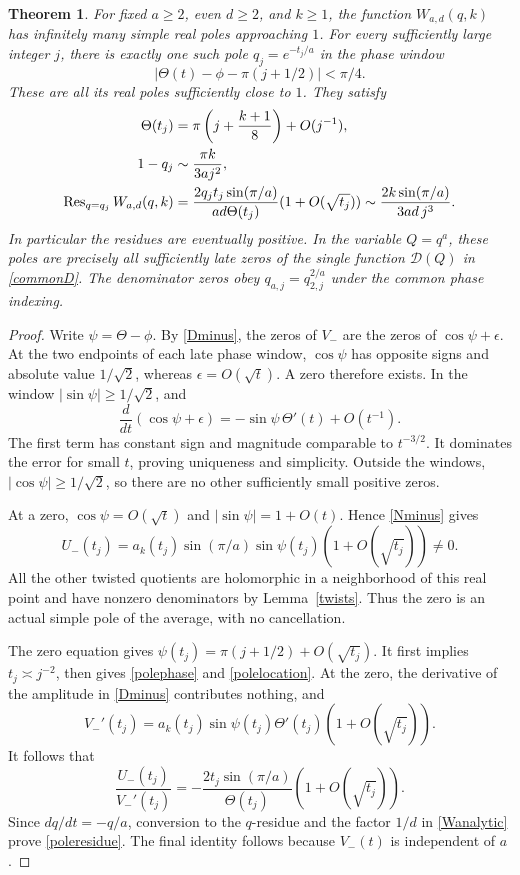 \documentclass[11pt]{amsart}
\newtheorem{theorem}{Theorem}[section]
\theoremstyle{definition}
\theoremstyle{remark}
\numberwithin{equation}{section}
\begin{document}
\begin{theorem}\label{poles}
For fixed $a\ge2$, even $d\ge2$, and $k\ge1$, the function $W_{a,d}(q,k)$ has infinitely many simple real poles approaching $1$. For every sufficiently large integer $j$, there is exactly one such pole $q_j=e^{-t_j/a}$ in the phase window
\[
 |\Theta(t)-\phi-\pi(j+1/2)|<\pi/4.
\]
These are all its real poles sufficiently close to $1$. They satisfy
\begin{align}
 \Theta(t_j)&=\pi\left(j+\frac{k+1}{8}\right)+O(j^{-1}),\label{polephase}\\
 1-q_j&\sim\frac{\pi k}{3aj^2},\label{polelocation}\\
 \operatorname{Res}_{q=q_j}W_{a,d}(q,k)
 &=\frac{2q_jt_j\sin(\pi/a)}{ad\Theta(t_j)}
       (1+O(\sqrt{t_j}))
 \sim\frac{2k\sin(\pi/a)}{3ad\,j^3}.\label{poleresidue}
\end{align}
In particular the residues are eventually positive. In the variable $Q=q^a$, these poles are precisely all sufficiently late zeros of the single function $\mathcal D(Q)$ in \eqref{commonD}. The denominator zeros obey $q_{a,j}=q_{2,j}^{2/a}$ under the common phase indexing.
\end{theorem}
\begin{proof}
Write $\psi=\Theta-\phi$. By \eqref{Dminus}, the zeros of $V_-$ are the zeros of $\cos\psi+\epsilon$. At the two endpoints of each late phase window, $\cos\psi$ has opposite signs and absolute value $1/\sqrt2$, whereas $\epsilon=O(\sqrt t)$. A zero therefore exists. In the window $|\sin\psi|\ge1/\sqrt2$, and
\[
 \frac{d}{dt}(\cos\psi+\epsilon)=-\sin\psi\,\Theta'(t)+O(t^{-1}).
\]
The first term has constant sign and magnitude comparable to $t^{-3/2}$. It dominates the error for small $t$, proving uniqueness and simplicity. Outside the windows, $|\cos\psi|\ge1/\sqrt2$, so there are no other sufficiently small positive zeros.

At a zero, $\cos\psi=O(\sqrt t)$ and $|\sin\psi|=1+O(t)$. Hence \eqref{Nminus} gives
\[
 U_-(t_j)=a_k(t_j)\sin(\pi/a)\sin\psi(t_j)
                  (1+O(\sqrt{t_j}))\ne0.
\]
All the other twisted quotients are holomorphic in a neighborhood of this real point and have nonzero denominators by Lemma~\ref{twists}. Thus the zero is an actual simple pole of the average, with no cancellation.

The zero equation gives $\psi(t_j)=\pi(j+1/2)+O(\sqrt{t_j})$. It first implies $t_j\asymp j^{-2}$, then gives \eqref{polephase} and \eqref{polelocation}. At the zero, the derivative of the amplitude in \eqref{Dminus} contributes nothing, and
\[
 V_-'(t_j)=a_k(t_j)\sin\psi(t_j)\Theta'(t_j)
                         (1+O(\sqrt{t_j})).
\]
It follows that
\[
 \frac{U_-(t_j)}{V_-'(t_j)}
 =-\frac{2t_j\sin(\pi/a)}{\Theta(t_j)}(1+O(\sqrt{t_j})).
\]
Since $dq/dt=-q/a$, conversion to the $q$-residue and the factor $1/d$ in \eqref{Wanalytic} prove \eqref{poleresidue}. The final identity follows because $V_-(t)$ is independent of $a$.
\end{proof}
\end{document}
